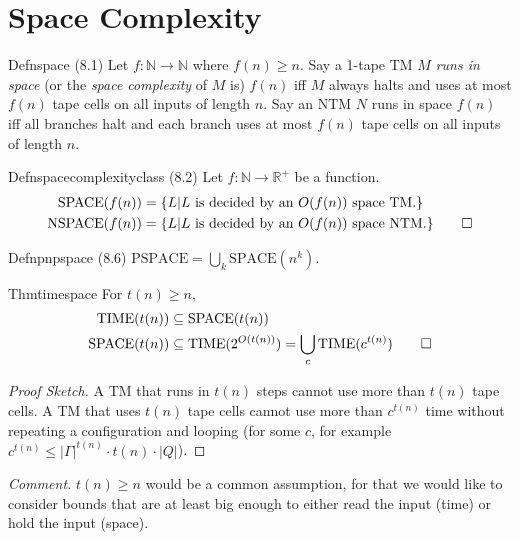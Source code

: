 \chapter{Space Complexity}

\begin{reference}{Defn}{space}
  (8.1) Let $f:\mathbb N\to \mathbb N$ where $f(n)\geq n$. Say a 1-tape TM $M$ \emph{runs in space} (or the \emph{space complexity} of $M$ is) $f(n)$ iff $M$ always halts and uses at most $f(n)$ tape cells on all inputs of length $n$. Say an NTM $N$ runs in space $f(n)$ iff all branches halt and each branch uses at most $f(n)$ tape cells on all inputs of length $n$.
\end{reference}

\begin{reference}{Defn}{spacecomplexityclass}
  (8.2) Let $f:\mathbb N\to \mathbb R^+$ be a function.
  \begin{align*}
    \mathrm{SPACE}(f(n))  & =\{L|L\text{ is decided by an }O(f(n))\text{ space TM.}\}          \\
    \mathrm{NSPACE}(f(n)) & =\{L|L\text{ is decided by an }O(f(n))\text{ space NTM.}\}\qedhere
  \end{align*}
\end{reference}

\begin{reference}{Defn}{pnpspace}
  (8.6) $\mathrm{PSPACE}=\bigcup_k \mathrm{SPACE}(n^k).$
\end{reference}

\begin{reference}{Thm}{timespace}
  For $t(n)\geq n$,
  \begin{align*}
    \mathrm{TIME}(t(n))  & \subseteq \mathrm{SPACE}(t(n))                                                 \\
    \mathrm{SPACE}(t(n)) & \subseteq \mathrm{TIME}(2^{O(t(n))})=\bigcup_c \mathrm{TIME}(c^{t(n)})\qedhere
  \end{align*}
\end{reference}

\begin{proof}[Proof Sketch]
  A TM that runs in $t(n)$ steps cannot use more than $t(n)$ tape cells. A TM that uses $t(n)$ tape cells cannot use more than $c^{t(n)}$ time without repeating a configuration and looping (for some $c$, for example $c^{t(n)}\leq|\Gamma|^{t(n)}\cdot t(n)\cdot|Q|$).
\end{proof}

\textit{Comment.} $t(n)\geq n$ would be a common assumption, for that we would like to consider bounds that are at least big enough to either read the input (time) or hold the input (space).

